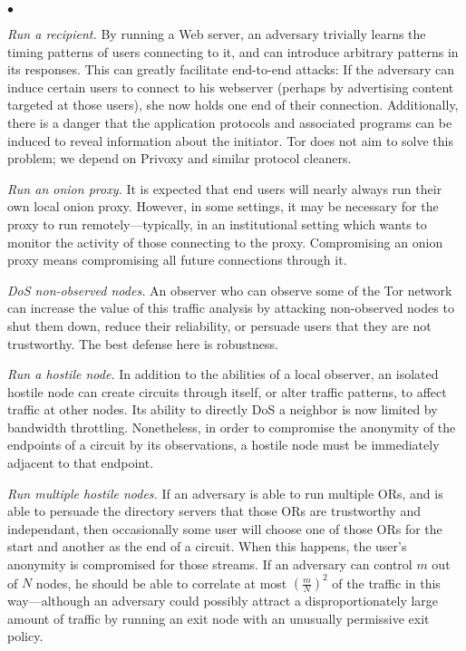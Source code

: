 \documentclass[times,10pt,twocolumn]{article}
\newenvironment{tightlist}{\begin{list}{$\bullet$}{
  \setlength{\itemsep}{0mm}
    \setlength{\parsep}{0mm}
    }}{\end{list}}
\begin{document}
\begin{tightlist}
\item \emph{Run a recipient.} By running a Web server, an adversary
  trivially learns the timing patterns of users connecting to it, and
  can introduce arbitrary patterns in its responses.  This can greatly
  facilitate end-to-end attacks: If the adversary can induce certain
  users to connect to his webserver (perhaps by advertising
  content targeted at those users), she now holds one end of their
  connection.  Additionally, there is a danger that the application
  protocols and associated programs can be induced to reveal
  information about the initiator. Tor does not aim to solve this problem;
  we depend on Privoxy and similar protocol cleaners.
  
\item \emph{Run an onion proxy.} It is expected that end users will
  nearly always run their own local onion proxy. However, in some
  settings, it may be necessary for the proxy to run
  remotely---typically, in an institutional setting which wants
  to monitor the activity of those connecting to the proxy.
  Compromising an onion proxy means compromising all future connections
  through it.

\item \emph{DoS non-observed nodes.} An observer who can observe some
  of the Tor network can increase the value of this traffic analysis
  by attacking non-observed nodes to shut them down, reduce
  their reliability, or persuade users that they are not trustworthy.
  The best defense here is robustness.
  
\item \emph{Run a hostile node.}  In addition to the abilities of a
  local observer, an isolated hostile node can create circuits through
  itself, or alter traffic patterns, to affect traffic at
  other nodes. Its ability to directly DoS a neighbor is now limited
  by bandwidth throttling. Nonetheless, in order to compromise the
  anonymity of the endpoints of a circuit by its observations, a
  hostile node must be immediately adjacent to that endpoint. 
  
\item \emph{Run multiple hostile nodes.}  If an adversary is able to
  run multiple ORs, and is able to persuade the directory servers
  that those ORs are trustworthy and independant, then occasionally
  some user will choose one of those ORs for the start and another
  as the end of a circuit.  When this happens, the user's
  anonymity is compromised for those streams.  If an adversary can
  control $m$ out of $N$ nodes, he should be able to correlate at most 
  $\left(\frac{m}{N}\right)^2$ of the traffic in this way---although an 
  adversary
  could possibly attract a disproportionately large amount of traffic
  by running an exit node with an unusually permissive exit policy.


\end{tightlist}
\end{document}
